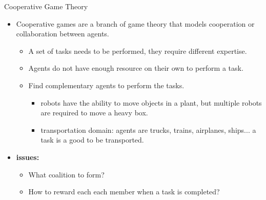 \documentclass{beamer}
\begin{document}
    \begin{frame}{Cooperative Game Theory}
      \begin{itemize}
         \item Cooperative games are a branch of game theory that models cooperation or collaboration between agents.   
         \begin{itemize}
            \item A set of tasks needs to be performed, they require different expertise.
            \item Agents do not have enough resource on their own to perform a task.
            \item Find complementary agents to perform the tasks.
            \begin{itemize}
                \item robots have the ability to move objects in a plant, but multiple robots are required to move a heavy box.
                \item transportation domain: agents are trucks, trains, airplanes, ships... a task is a good to be transported.
            \end{itemize}
        \end{itemize}      
        \item \textbf{issues:}
            \begin{itemize}
                \item What coalition to form?
                \item How to reward each each member when a task is completed?
            \end{itemize}
      \end{itemize}
    \end{frame}
    
\end{document}
